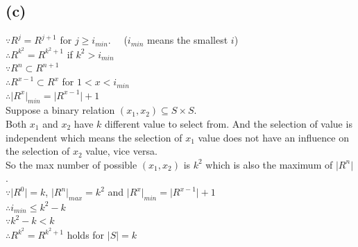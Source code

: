 \documentclass{article} %
\begin{document}
\subsection*{(c)}
$\because R^j = R^{j+1}$ for $j\geqslant i_{min}$. \ \ ($i_{min}$ means the smallest $i$)\\
$\therefore R^{k^2} = R^{k^2+1}$ if $k^2 > i_{min}$\\
$\because R^n \subset R^{n + 1}$\\
$\therefore R^{x-1} \subset R^{x}$ for $1 < x < i_{min}$ \\
$\therefore \vert R^{x}\vert_{min} = \vert R^{x-1}\vert + 1$\\
Suppose a binary relation $(x_1, x_2) \subseteq S \times S$.\\
Both $x_1$ and $x_2$ have $k$ different value to select from. And the selection of value is independent which means the selection of $x_1$ value does not have an influence on the selection of $x_2$ value, vice versa.\\
So the max number of possible $(x_1,x_2)$ is $k^2$ which is also the maximum of $\vert R^{n}\vert$.\\
$\because \vert R^{0}\vert = k$, $\vert R^{n}\vert_{max} = k^2$ and $\vert R^{x}\vert_{min} = \vert R^{x-1}\vert + 1$\\
$\therefore i_{min}\leqslant k^2-k$\\
$\because k^2-k < k$\\
$\therefore R^{k^2} = R^{k^2+1}$ holds for $\vert S \vert = k$\\
\end{document}
